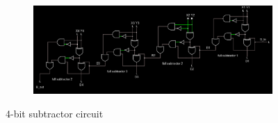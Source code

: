 \documentclass{article}
\begin{document}
\begin{figure}[H]
		\begin{subfigure}[b]{0.8\textwidth}
			\centering
			\includegraphics[width=\textwidth]{4bit/4bit_110.png}
		\end{subfigure}
		
		\caption{4-bit subtractor circuit}
		\label{4bit1}
	\end{figure}
	
\end{document}
